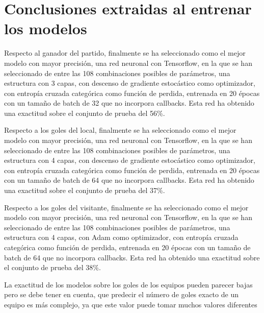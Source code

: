\section{Conclusiones extraidas al entrenar los modelos}











Respecto al ganador del partido, finalmente se ha seleccionado como el mejor modelo con mayor 
precisión, una red neuronal con Tensorflow, en la que se han seleccionado de entre las 108 
combinaciones posibles de parámetros, una estructura con 3 capas, con descenso de gradiente 
estocástico como optimizador, con entropía cruzada categórica como función de perdida, 
entrenada en 20 épocas con un tamaño de batch de 32 que no incorpora callbacks. Esta red ha 
obtenido una exactitud sobre el conjunto de prueba del 56\%.

Respecto a los goles del local, finalmente se ha seleccionado como el mejor modelo con mayor 
precisión, una red neuronal con Tensorflow, en la que se han seleccionado de entre las 108 
combinaciones posibles de parámetros, una estructura con 4 capas, con descenso de gradiente 
estocástico como optimizador, con entropía cruzada categórica como función de perdida, 
entrenada en 20 épocas con un tamaño de batch de 64 que no incorpora callbacks. Esta red ha 
obtenido una exactitud sobre el conjunto de prueba del 37\%.

Respecto a los goles del visitante, finalmente se ha seleccionado como el mejor modelo con mayor 
precisión, una red neuronal con Tensorflow, en la que se han seleccionado de entre las 108 
combinaciones posibles de parámetros, una estructura con 4 capas, con Adam como optimizador, 
con entropía cruzada categórica como función de perdida, entrenada en 20 épocas con un tamaño 
de batch de 64 que no incorpora callbacks. Esta red ha obtenido una exactitud sobre el conjunto 
de prueba del 38\%.

La exactitud de los modelos sobre los goles de los equipos pueden parecer bajas pero se debe 
tener en cuenta, que predecir el número de goles exacto de un equipo es más complejo, ya que 
este valor puede tomar muchos valores diferentes



